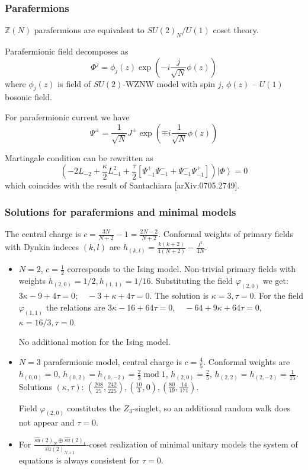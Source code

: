 \documentclass[pdftex]{beamer}
\theoremstyle{definition} \newtheorem{Def}{Definition}
\begin{document}
\begin{frame}
  \frametitle{Parafermions}
  $\mathbb{Z}(N)$ parafermions are equivalent to $SU(2)_{N}/U(1)$ coset theory.
  
  Parafermionic field decomposes as
  \begin{equation*}
    \Phi^{j}=\phi_{j}(z) \exp\left( -i \frac{j}{\sqrt{N}}\phi(z)\right)
  \end{equation*}
  where $\phi_{j}(z)$ is field of $SU(2)$-WZNW model with spin $j$, $\phi(z)$ -- $U(1)$ bosonic field.
  
  For parafermionic current we have
  \begin{equation*}
    \Psi^{\pm}=\frac{1}{\sqrt{N}} J^{\pm}\exp\left(\mp i \frac{1}{\sqrt{N}}\phi(z)\right)
  \end{equation*}

  Martingale condition can be rewritten as
  \begin{equation*}
    \left(-2 L_{-2}+\frac{\kappa}{2}L_{-1}^{2}+\frac{\tau}{2}\left[\Psi^{+}_{-1}\Psi^{-}_{-1}+\Psi^{-}_{-1}\Psi^{+}_{-1}\right]\right) \left|\Phi\right>=0
  \end{equation*}
  which coincides with the result of Santachiara [arXiv:0705.2749].
\end{frame}
\begin{frame}
  \frametitle{Solutions for parafermions and minimal models}
  The central charge is $c=\frac{3N}{N+2}-1=\frac{2N-2}{N+2}$. Conformal weights of primary fields with Dynkin indeces $(k,l)$ are $h_{(k,l)}=\frac{k(k+2)}{4(N+2)}-\frac{l^{2}}{4N}$.

  \begin{itemize}
  \item $N=2$, $c=\frac{1}{2}$ corresponds to the Ising model. Non-trivial primary fields with
    weights $h_{(2,0)}=1/2, h_{(1,1)}=1/16$.   
    Substituting the field $\varphi_{(2,0)}$  we get: $3\kappa-9+4\tau =0;\quad -3+\kappa+4\tau=0$.
    The solution is $\kappa=3, \tau=0$. For the field $\varphi_{(1,1)}$ the relations are
    $3\kappa-16+64\tau=0,\quad -64+9\kappa + 64\tau=0$, $\kappa=16/3, \tau=0$. 

    No additional motion for the Ising model.
  \item $N=3$ parafermionic model, central charge is $c=\frac{4}{5}$. Conformal weights are
    $h_{(0,0)}=0$, $h_{(0,2)}=h_{(0,-2)}=\frac{2}{3}\; \mathrm{mod}\; 1$, $h_{(2,0)}=\frac{2}{5}$,
    $h_{(2,2)}=h_{(2,-2)}=\frac{1}{15}$.  Solutions $(\kappa,\tau)$:
    $(\frac{208}{25},\frac{242}{225}), (\frac{10}{3},0),(\frac{80}{19},\frac{14}{171})$. 

    Field $\varphi_{(2,0)}$ constitutes the $Z_{3}$-singlet, so  an additional random walk does not
    appear and $\tau=0$.

  \item 
    For $\frac{\hat{su}(2)_{N}\oplus \hat{su}(2)_{1}}{\hat{su}(2)_{N+1}}$-coset realization of minimal unitary models the system of equations is always consistent for $\tau=0$.
  \end{itemize}

\end{frame}
\end{document}

